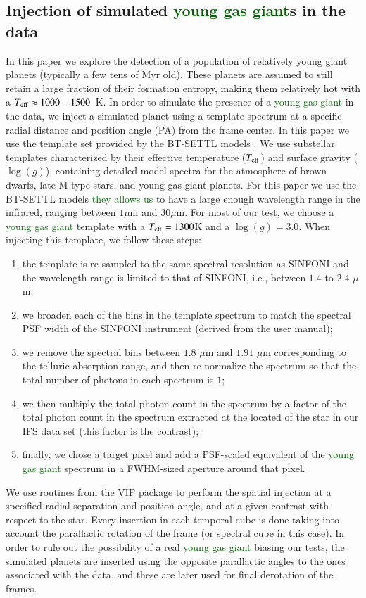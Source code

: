 \documentclass[referee]{aa} %
\newcommand{\newchange}[1]{\textcolor{darkgreen}{#1}}
\begin{document}
\subsection{Injection of simulated \newchange{young gas giant}s in the data}\label{sec: FC insertion}

In this paper we explore the detection of a population of relatively young giant planets (typically a few tens of Myr old). These planets are assumed to still retain a large fraction of their formation entropy, making them relatively hot with a $T_{\rm eff}\approx 1000 - 1500$~K.
In order to simulate the presence of a \newchange{young gas giant} in the data, we inject a simulated planet using a template spectrum at a specific radial distance and position angle (PA) from the frame center.
In this paper we use the template set provided by the BT-SETTL models \citep{1997Allard, 2011Allard,2003BTsettl}.%
We use substellar templates characterized by their effective temperature ($T_{\rm{eff}}$) and surface gravity ($\log(g)$), containing detailed model spectra for the atmosphere of brown dwarfs, late M-type stars, and young gas-giant planets.
For this paper we use the BT-SETTL models \newchange{they allows us} to have a large enough wavelength range in the infrared, ranging between $1\mu$m and $30\mu$m.
For most of our test, we choose a \newchange{young gas giant} template with a $T_{\rm eff} = 1300$K and a $\log(g)=3.0$.
When injecting this template, we follow these steps:
\begin{enumerate}
    \item the template is re-sampled to the same spectral resolution as SINFONI and the wavelength range is limited to that of SINFONI, i.e., between $1.4$ to $2.4$ $\mu$m;
    \item we broaden each of the bins in the template spectrum to match the spectral PSF width of the SINFONI instrument (derived from the user manual);
    \item we remove the spectral bins between $1.8$ $\mu$m and $1.91$ $\mu$m corresponding to the telluric absorption range, and then re-normalize the spectrum so that the total number of photons in each spectrum is $1$;
    \item we then multiply the total photon count in the spectrum by a factor of the total photon count in the spectrum extracted at the located of the star in our IFS data set (this factor is the contrast);
    \item finally, we chose a target pixel and add a PSF-scaled equivalent of the \newchange{young gas giant} spectrum in a FWHM-sized aperture around that pixel.
\end{enumerate}
We use routines from the \textsc{VIP} package to perform the spatial injection at a specified radial separation and position angle, and at a given contrast with respect to the star.
Every insertion in each temporal cube is done taking into account the parallactic rotation of the frame (or spectral cube in this case).
In order to rule out the possibility of a real \newchange{young gas giant} biasing our tests, the simulated planets are inserted using the opposite parallactic angles to the ones associated with the data, and these are later used for final derotation of the frames.
\end{document}
